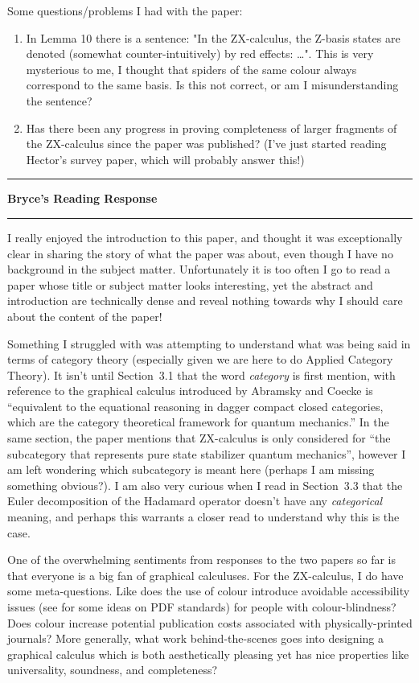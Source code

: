 \documentclass{amsart}
\newcommand{\iam}[1]{
  \vspace{0.25em}
  \hrule
  \vspace{0.25em}
  \textbf{{#1}'s Reading Response}
  \vspace{0.25em}
  \hrule
  \vspace{1em}
}
\begin{document}
Some questions/problems I had with the paper:
\begin{enumerate}
\item In Lemma 10 there is a sentence: "In the ZX-calculus, the Z-basis states are denoted (somewhat counter-intuitively) by red effects: \dots". This is very mysterious to me, I thought that spiders of the same colour always correspond to the same basis. Is this not correct, or am I misunderstanding the sentence?
\item Has there been any progress in proving completeness of larger fragments of the ZX-calculus since the paper was published? (I've just started reading Hector's survey paper, which will probably answer this!)
\end{enumerate}

\iam{Bryce}

I really enjoyed the introduction to this paper, and thought it was exceptionally clear
in sharing the story of what the paper was about, even though I have no background in
the subject matter. Unfortunately it is too often I go to read a paper whose title or
subject matter looks interesting, yet the abstract and introduction are technically
dense and reveal nothing towards why I should care about the content of the paper!

Something I struggled with was attempting to understand what was being said in terms
of category theory (especially given we are here to do Applied Category Theory).
It isn't until Section~3.1 that the word \emph{category} is first mention, with
reference to the graphical calculus introduced by Abramsky and Coecke \cite{CatSem}
is ``equivalent to the equational reasoning in dagger compact closed categories,
 which are the category theoretical framework for quantum mechanics.''
In the same section, the paper mentions that ZX-calculus is only considered for
``the subcategory that represents pure state stabilizer quantum mechanics'', however
I am left wondering which subcategory is meant here
(perhaps I am missing something obvious?).
I am also very curious when I read in Section~3.3 that the Euler decomposition of the
Hadamard operator doesn't have any \emph{categorical} meaning,
and perhaps this warrants a closer read to understand why this is the case.

One of the overwhelming sentiments from responses to the two papers so far
is that everyone is a big fan of graphical calculuses. For the ZX-calculus, I do
have some meta-questions. Like does the use of colour introduce avoidable
accessibility issues (see \cite{PDF-A3u} for some ideas on PDF standards)
for people with colour-blindness? Does colour increase potential publication costs
associated with physically-printed journals?
More generally, what work behind-the-scenes goes into designing a graphical calculus
which is both aesthetically pleasing yet has nice properties like universality,
soundness, and completeness?
\end{document}
